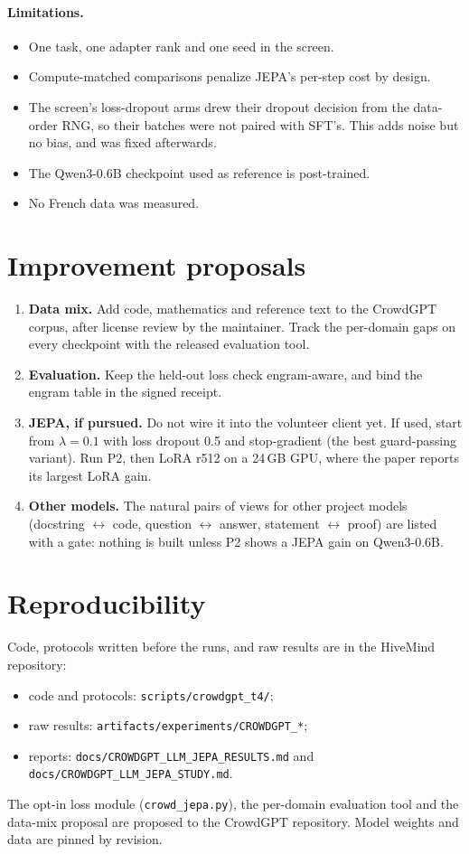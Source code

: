 \documentclass[11pt]{article}
\begin{document}
\paragraph{Limitations.}
\begin{itemize}
\item One task, one adapter rank and one seed in the screen.
\item Compute-matched comparisons penalize JEPA's per-step cost by design.
\item The screen's loss-dropout arms drew their dropout decision from the data-order RNG, so their batches were not
paired with SFT's. This adds noise but no bias, and was fixed afterwards.
\item The Qwen3-0.6B checkpoint used as reference is post-trained.
\item No French data was measured.
\end{itemize}

\section{Improvement proposals}
\begin{enumerate}
\item \textbf{Data mix.} Add code, mathematics and reference text to the CrowdGPT corpus, after license review by the
maintainer. Track the per-domain gaps on every checkpoint with the released evaluation tool.
\item \textbf{Evaluation.} Keep the held-out loss check engram-aware, and bind the engram table in the signed receipt.
\item \textbf{JEPA, if pursued.} Do not wire it into the volunteer client yet. If used, start from $\lambda=0.1$ with loss
dropout 0.5 and stop-gradient (the best guard-passing variant). Run P2, then LoRA r512 on a 24\,GB GPU, where the paper
reports its largest LoRA gain.
\item \textbf{Other models.} The natural pairs of views for other project models (docstring $\leftrightarrow$ code,
question $\leftrightarrow$ answer, statement $\leftrightarrow$ proof) are listed with a gate: nothing is built unless P2
shows a JEPA gain on Qwen3-0.6B.
\end{enumerate}

\section*{Reproducibility}
Code, protocols written before the runs, and raw results are in the HiveMind repository:
\begin{itemize}
\item code and protocols: \texttt{scripts/crowdgpt\_t4/};
\item raw results: \texttt{artifacts/experiments/CROWDGPT\_*};
\item reports: \texttt{docs/CROWDGPT\_LLM\_JEPA\_RESULTS.md} and \texttt{docs/CROWDGPT\_LLM\_JEPA\_STUDY.md}.
\end{itemize}
The opt-in loss module (\texttt{crowd\_jepa.py}), the per-domain evaluation tool and the data-mix proposal are proposed
to the CrowdGPT repository. Model weights and data are pinned by revision.
\end{document}
